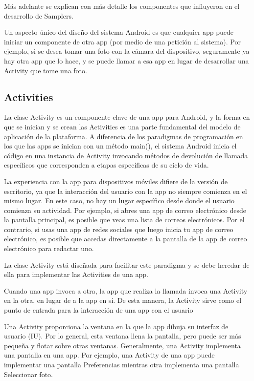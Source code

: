 Más adelante se explican con más detalle los componentes que influyeron en el desarrollo de Samplers.

Un aspecto único del diseño del sistema Android es que cualquier app puede iniciar un componente de otra app (por medio de una petición al sistema). Por ejemplo, si se desea tomar una foto con la cámara del dispositivo, seguramente ya hay otra app que lo hace, y se puede llamar a esa app en lugar de desarrollar una Activity que tome una foto.
\cite{androidDocs}

\subsection{Activities}
La clase Activity es un componente clave de una app para Android, y la forma en que se inician y se crean las Activities es una parte fundamental del modelo de aplicación de la plataforma. A diferencia de los paradigmas de programación en los que las apps se inician con un método main(), el sistema Android inicia el código en una instancia de Activity invocando métodos de devolución de llamada específicos que corresponden a etapas específicas de su ciclo de vida. 

La experiencia con la app para dispositivos móviles difiere de la versión de escritorio, ya que la interacción del usuario con la app no siempre comienza en el mismo lugar. En este caso, no hay un lugar específico desde donde el usuario comienza su actividad. Por ejemplo, si abres una app de correo electrónico desde la pantalla principal, es posible que veas una lista de correos electrónicos. Por el contrario, si usas una app de redes sociales que luego inicia tu app de correo electrónico, es posible que accedas directamente a la pantalla de la app de correo electrónico para redactar uno.

La clase Activity está diseñada para facilitar este paradigma y se debe heredar de ella para implementar las Activities de una app. 

Cuando una app invoca a otra, la app que realiza la llamada invoca una Activity en la otra, en lugar de a la app en sí. De esta manera, la Activity sirve como el punto de entrada para la interacción de una app con el usuario

Una Activity proporciona la ventana en la que la app dibuja su interfaz de usuario (IU). Por lo general, esta ventana llena la pantalla, pero puede ser más pequeña y flotar sobre otras ventanas. Generalmente, una Activity implementa una pantalla en una app. Por ejemplo, una Activity de una app puede implementar una pantalla Preferencias mientras otra implementa una pantalla Seleccionar foto. 

